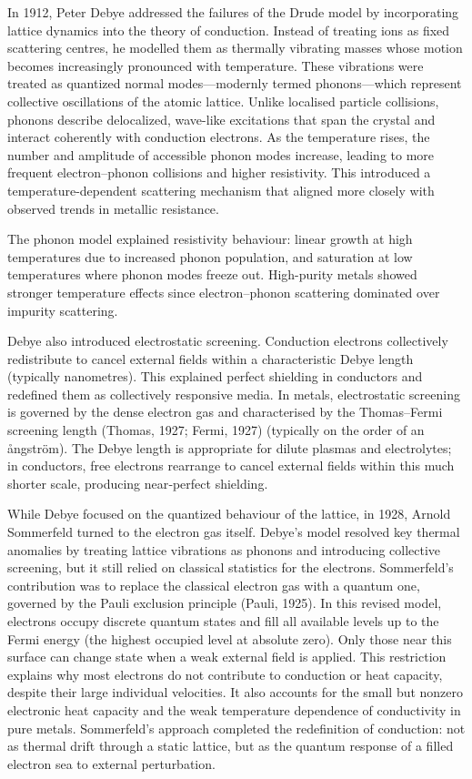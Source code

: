 In 1912, Peter Debye addressed the failures of the Drude model by incorporating lattice dynamics into the theory of conduction. Instead of treating ions as fixed scattering centres, he modelled them as thermally vibrating masses whose motion becomes increasingly pronounced with temperature. These vibrations were treated as quantized normal modes—modernly termed phonons—which represent collective oscillations of the atomic lattice. Unlike localised particle collisions, phonons describe delocalized, wave-like excitations that span the crystal and interact coherently with conduction electrons. As the temperature rises, the number and amplitude of accessible phonon modes increase, leading to more frequent electron–phonon collisions and higher resistivity. This introduced a temperature-dependent scattering mechanism that aligned more closely with observed trends in metallic resistance.

The phonon model explained resistivity behaviour: linear growth at high temperatures due to increased phonon population, and saturation at low temperatures where phonon modes freeze out. High-purity metals showed stronger temperature effects since electron–phonon scattering dominated over impurity scattering.

Debye also introduced electrostatic screening. Conduction electrons collectively redistribute to cancel external fields within a characteristic Debye length (typically nanometres). This explained perfect shielding in conductors and redefined them as collectively responsive media.
In metals, electrostatic screening is governed by the dense electron gas and characterised by the Thomas–Fermi screening length (Thomas, 1927; Fermi, 1927) (typically on the order of an ångström). The Debye length is appropriate for dilute plasmas and electrolytes; in conductors, free electrons rearrange to cancel external fields within this much shorter scale, producing near‑perfect shielding.

While Debye focused on the quantized behaviour of the lattice, in 1928, Arnold Sommerfeld turned to the electron gas itself. Debye's model resolved key thermal anomalies by treating lattice vibrations as phonons and introducing collective screening, but it still relied on classical statistics for the electrons. Sommerfeld's contribution was to replace the classical electron gas with a quantum one, governed by the Pauli exclusion principle (Pauli, 1925). In this revised model, electrons occupy discrete quantum states and fill all available levels up to the Fermi energy (the highest occupied level at absolute zero). Only those near this surface can change state when a weak external field is applied. This restriction explains why most electrons do not contribute to conduction or heat capacity, despite their large individual velocities. It also accounts for the small but nonzero electronic heat capacity and the weak temperature dependence of conductivity in pure metals. Sommerfeld's approach completed the redefinition of conduction: not as thermal drift through a static lattice, but as the quantum response of a filled electron sea to external perturbation.

